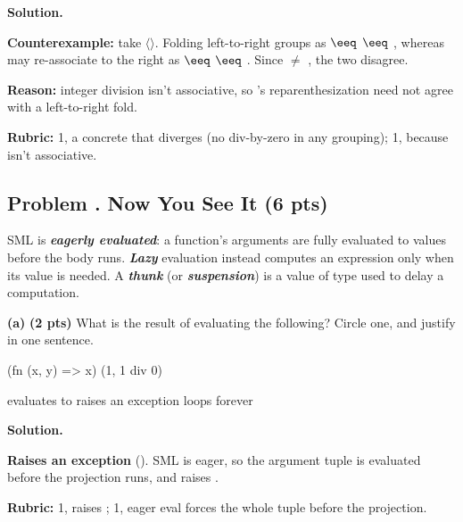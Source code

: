 \documentclass[crop=false]{standalone}
\newif\ifsol
\newenvironment{solution}
    {\par\color{solution_color}\begin{framed}\textbf{Solution.}\par}
    {\end{framed}}
\newcommand{\term}[1]{\textbf{\textit{#1}}}
\newcommand{\quizproblem}[3]{%
  \needspace{5\baselineskip}%
  \stepcounter{problem}%
  \ifsol
    \subsection*{Problem \arabic{problem}. #1 \hfill \timing{#2} \quad (#3 pts)}%
  \else
    \subsection*{Problem \arabic{problem}. #1 \hfill (#3 pts)}%
  \fi
}
\newcommand{\subpts}[1]{\textbf{(#1 pts)}}
\newcommand{\answerspace}[1]{\ifsol\else\vspace{#1}\par\fi}
\begin{document}
\begin{solution}
\textbf{Counterexample:} take $\langle$$\rangle$.
Folding  left-to-right groups as 
$\eeq$  $\eeq$ , whereas  may
re-associate to the right as  $\eeq$
 $\eeq$ . Since  $\neq$ , the two
disagree.

\textbf{Reason:} integer division isn't associative, so 's
reparenthesization need not agree with a left-to-right fold.

\textbf{Rubric:} 1, a concrete  that diverges (no div-by-zero in
any grouping); 1, because  isn't associative.
\end{solution}

\newpage


\quizproblem{Now You See It}{6}{6}

SML is \term{eagerly evaluated}: a function's arguments are fully
evaluated to values before the body runs. \term{Lazy} evaluation instead
computes an expression only when its value is needed. A \term{thunk}
(or \term{suspension}) is a value of type  used to
delay a computation.

\textbf{(a)} \subpts{2} What is the result of evaluating the following?
Circle one, and justify in one sentence.

\begin{codeblock}
  (fn (x, y) => x) (1, 1 div 0)
\end{codeblock}

\vspace{0.3em}
\hspace{2em} evaluates to  \qquad raises an exception \qquad
loops forever

\answerspace{2.5cm}

\begin{solution}
\textbf{Raises an exception} (). SML is eager, so the argument
tuple  is evaluated before the projection runs, and
 raises .

\textbf{Rubric:} 1, raises ; 1, eager eval forces the whole
tuple before the projection.
\end{solution}
\end{document}
